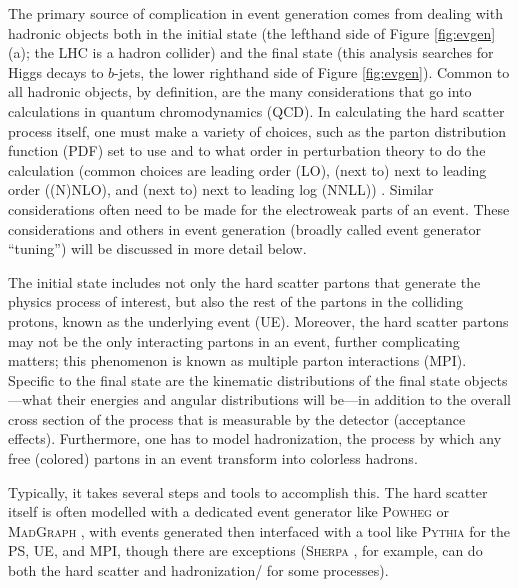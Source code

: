 The primary source of complication in event generation comes from dealing with hadronic objects both in the initial state (the lefthand side of Figure \ref{fig:evgen} (a); the LHC is a hadron collider) and the final state (this analysis searches for Higgs decays to $b$-jets, the lower righthand side of Figure \ref{fig:evgen}).  Common to all hadronic objects, by definition, are the many considerations that go into calculations in quantum chromodynamics (QCD).  In calculating the hard scatter process itself, one must make a variety of choices, such as the parton distribution function (PDF) set to use and to what order in perturbation theory to do the calculation (common choices are leading order (LO), (next to) next to leading order ((N)NLO), and (next to) next to leading log (NNLL)) \cite{schwartz}.  Similar considerations often need to be made for the electroweak parts of an event.  These considerations and others in event generation (broadly called event generator ``tuning'') will be discussed in more detail below.  

The initial state includes not only the hard scatter partons that generate the physics process of interest, but also the rest of the partons in the colliding protons, known as the underlying event (UE).  Moreover, the hard scatter partons may not be the only interacting partons in an event, further complicating matters; this phenomenon is known as multiple parton interactions (MPI).  Specific to the final state are the kinematic distributions of the final state objects---what their energies and angular distributions will be---in addition to the overall cross section of the process that is measurable by the detector (acceptance effects).  Furthermore, one has to model hadronization, the process by which any free (colored) partons in an event transform into colorless hadrons.

Typically, it takes several steps and tools to accomplish this.  The hard scatter itself is often modelled with a dedicated event generator like \textsc{Powheg} \cite{powheg0} or \textsc{MadGraph} \cite{madgraph}, with events generated then interfaced with a tool like \textsc{Pythia} \cite{pythia8} for the PS, UE, and MPI, though there are exceptions (\textsc{Sherpa} \cite{sherpa}, for example, can do both the hard scatter and hadronization/ for some processes).

